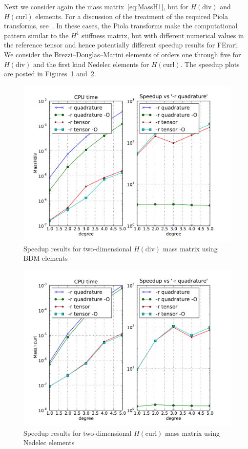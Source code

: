 Next we consider again the mass matrix~\eqref{eq:MassH1}, but for \(
H(\mathrm{div})\) and \(H(\mathrm{curl})\) elements. For a discussion
of the treatment of the required Piola transforms,
see~\cite{RognesKirbyEtAl2008}. In these cases, the Piola transforms
make the computational pattern similar to the \( H^1 \) stiffness
matrix, but with different numerical values in the reference tensor
and hence potentially different speedup results for FErari. We
consider the Brezzi--Douglas--Marini elements of orders one through
five for \( H(\mathrm{div}) \) and the first kind Nedelec elements for
\( H(\mathrm{curl}) \). The speedup plots are posted in
Figures~\ref{fig:MassHdiv} and~\ref{fig:MassHcurl}.

\begin{figure}
  \begin{center}
    \includegraphics[width=12cm]{chapters/kirby-3/pdf/MassHdiv.pdf}
    \caption{Speedup results for two-dimensional \( H(\mathrm{div}) \)
      mass matrix  using BDM elements}
    \label{fig:MassHdiv}
  \end{center}
\end{figure}
\begin{figure}
  \begin{center}
    \includegraphics[width=12cm]{chapters/kirby-3/pdf/MassHcurl.pdf}
    \caption{Speedup results for two-dimensional \( H(\mathrm{curl}) \)
      mass matrix using Nedelec elements}
    \label{fig:MassHcurl}
  \end{center}
\end{figure}

